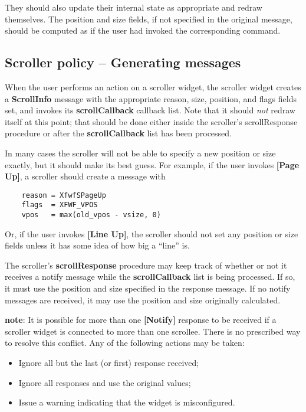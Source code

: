 They should also update their internal state as appropriate and redraw
themselves.  The position and size fields, if not specified in the
original message, should be computed as if the user had invoked the
corresponding command.


\subsection{Scroller policy -- Generating messages}

When the user performs an action on a scroller widget, the scroller
widget creates a {\bf ScrollInfo} message with the appropriate reason, size,
position, and flags fields set, and invokes its {\bf scrollCallback}
callback list.  Note that it should {\it not}\/ redraw itself at this point;
that should be done either inside the scroller's scrollResponse
procedure or after the {\bf scrollCallback} list has been processed.

In many cases the scroller will not be able to specify a new position
or size exactly, but it should make its best guess.  For example, if
the user invokes {\bf [Page Up]}, a scroller should create a message with

\begin{verbatim}
	reason = XfwfSPageUp
	flags  = XFWF_VPOS
	vpos   = max(old_vpos - vsize, 0)
\end{verbatim}

Or, if the user invokes {\bf [Line Up]}, the scroller should not set any
position or size fields unless it has some idea of how big a ``line'' is.

The scroller's {\bf scrollResponse} procedure may keep track of whether or
not it receives a notify message while the {\bf scrollCallback} list is
being processed.  If so, it must use the position and size specified
in the response message.  If no notify messages are received, it may
use the position and size originally calculated.

{\bf note}: It is possible for more than one {\bf [Notify]} response to be
received if a scroller widget is connected to more than one scrollee.  There
is no prescribed way to resolve this conflict.  Any of the following
actions may be taken:

\begin{itemize}

\item
Ignore all but the last (or first) response received;

\item
Ignore all responses and use the original values;

\item
Issue a warning indicating that the widget is misconfigured.

\end{itemize}

